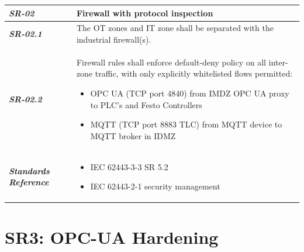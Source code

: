 \documentclass{report}
\begin{document}
\begin{tabularx}{\textwidth}{>{\bfseries}p{2.5cm} X}
    \textit{SR-02} & \textbf{Firewall with protocol inspection} \vspace{0.5em}\\
\toprule
\textit{SR-02.1} &
    The OT zones and IT zone shall be separated with the industrial firewall(s).
    \vspace{0.5em}
\\
\textit{SR-02.2} &
Firewall rules shall enforce default-deny policy on all inter-zone traffic,
with only explicitly whitelisted flows permitted:
\begin{itemize}[label=-, itemsep=0pt, topsep=2pt]
    \item OPC UA (TCP port 4840) from IMDZ OPC UA proxy to PLC's and Festo Controllers
    \item MQTT (TCP port 8883 TLC) from MQTT device to MQTT broker in IDMZ
\end{itemize} \vspace{1em}
    \\
\midrule
    \textit{Standards Reference} &
\begin{itemize}[label=-, noitemsep, topsep=0pt, leftmargin=*]
    \item IEC 62443-3-3 SR 5.2
    \item IEC 62443-2-1 security management
\end{itemize} \vspace{1em} \\ 
\end{tabularx}
\vspace{2em}

\section{SR3: OPC-UA Hardening}\label{SR3:opc}
\end{document}
